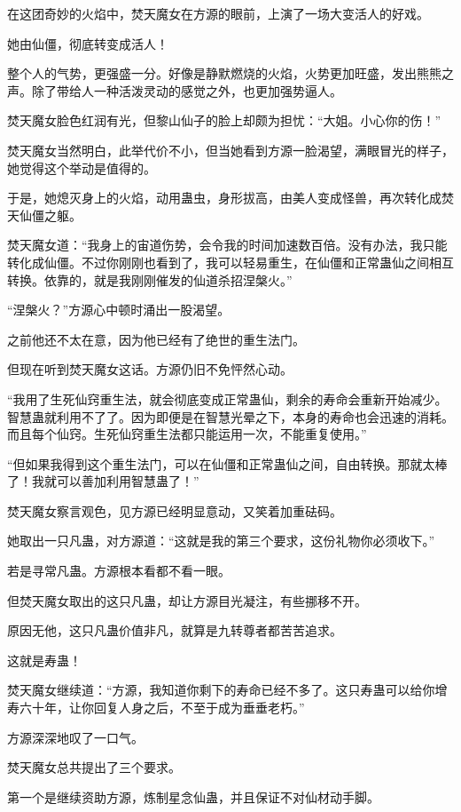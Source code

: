 \begin{this_body}
在这团奇妙的火焰中，焚天魔女在方源的眼前，上演了一场大变活人的好戏。

她由仙僵，彻底转变成活人！

整个人的气势，更强盛一分。好像是静默燃烧的火焰，火势更加旺盛，发出熊熊之声。除了带给人一种活泼灵动的感觉之外，也更加强势逼人。

焚天魔女脸色红润有光，但黎山仙子的脸上却颇为担忧：“大姐。小心你的伤！”

焚天魔女当然明白，此举代价不小，但当她看到方源一脸渴望，满眼冒光的样子，她觉得这个举动是值得的。

于是，她熄灭身上的火焰，动用蛊虫，身形拔高，由美人变成怪兽，再次转化成焚天仙僵之躯。

焚天魔女道：“我身上的宙道伤势，会令我的时间加速数百倍。没有办法，我只能转化成仙僵。不过你刚刚也看到了，我可以轻易重生，在仙僵和正常蛊仙之间相互转换。依靠的，就是我刚刚催发的仙道杀招涅槃火。”

“涅槃火？”方源心中顿时涌出一股渴望。

之前他还不太在意，因为他已经有了绝世的重生法门。

但现在听到焚天魔女这话。方源仍旧不免怦然心动。

“我用了生死仙窍重生法，就会彻底变成正常蛊仙，剩余的寿命会重新开始减少。智慧蛊就利用不了了。因为即便是在智慧光晕之下，本身的寿命也会迅速的消耗。而且每个仙窍。生死仙窍重生法都只能运用一次，不能重复使用。”

“但如果我得到这个重生法门，可以在仙僵和正常蛊仙之间，自由转换。那就太棒了！我就可以善加利用智慧蛊了！”

焚天魔女察言观色，见方源已经明显意动，又笑着加重砝码。

她取出一只凡蛊，对方源道：“这就是我的第三个要求，这份礼物你必须收下。”

若是寻常凡蛊。方源根本看都不看一眼。

但焚天魔女取出的这只凡蛊，却让方源目光凝注，有些挪移不开。

原因无他，这只凡蛊价值非凡，就算是九转尊者都苦苦追求。

这就是寿蛊！

焚天魔女继续道：“方源，我知道你剩下的寿命已经不多了。这只寿蛊可以给你增寿六十年，让你回复人身之后，不至于成为垂垂老朽。”

方源深深地叹了一口气。

焚天魔女总共提出了三个要求。

第一个是继续资助方源，炼制星念仙蛊，并且保证不对仙材动手脚。


\end{this_body}
